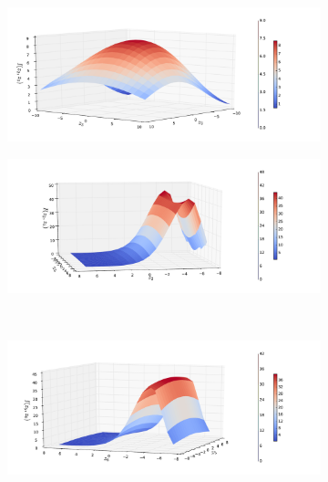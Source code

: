 \FloatBarrier
\begin{figure}
	\begin{subfigure}{.4\textwidth}
		\centering
			\includegraphics[width=1\linewidth]{./figures/basket_call_2d_time_stepping/integrand_plotting/N_4/2d_plots/z_2_3/smoothed_integrand_basket_2D_N_4_z2_3_40}
		\caption{}
	\end{subfigure}%
	\begin{subfigure}{.4\textwidth}
		\centering
			\includegraphics[width=1\linewidth]{./figures/basket_call_2d_time_stepping/integrand_plotting/N_4/2d_plots/z_2_5/smoothed_integrand_basket_2D_N_4_z2_5_80}
		\caption{}
	\end{subfigure}\\[1ex]
	\begin{subfigure}{.4\textwidth}
		\centering
			\includegraphics[width=1\linewidth]{./figures/basket_call_2d_time_stepping/integrand_plotting/N_4/2d_plots/z_5_6/smoothed_integrand_basket_2D_N_4_z5_6_200}

\end{subfigure}
\end{figure}
